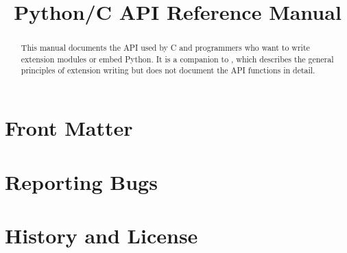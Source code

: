 \documentclass{manual}
\title{Python/C API Reference Manual}
\begin{document}
\maketitle

\ifhtml
\chapter*{Front Matter\label{front}}
\fi



\begin{abstract}

\noindent
This manual documents the API used by C and \Cpp{} programmers who
want to write extension modules or embed Python.  It is a companion to
, which describes the general principles of extension
writing but does not document the API functions in detail.


\end{abstract}

\tableofcontents














%


\appendix
\chapter{Reporting Bugs}


\chapter{History and License}


\end{document}
